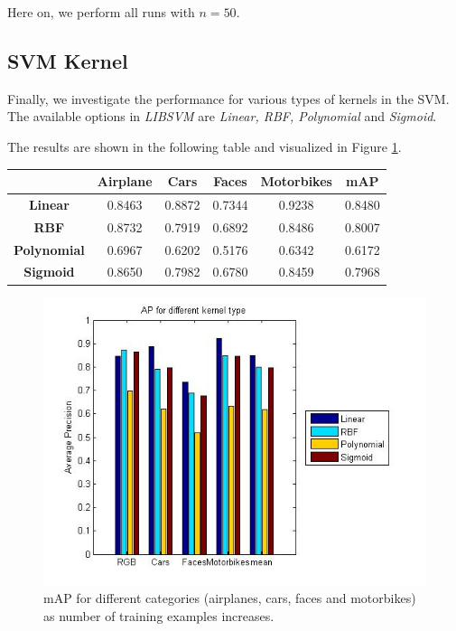 \documentclass[11pt]{article}
\begin{document}
Here on, we perform all runs with $n = 50$. 

\subsection{SVM Kernel}
Finally, we investigate the performance for various types of kernels in the SVM. The available options in \textit{LIBSVM} are \textit{Linear, RBF, Polynomial} and \textit{Sigmoid}. 

The results are shown in the following table and visualized in Figure \ref{fig:svm_kernel}. 

\begin{center}
	\begin{tabular}{| c | c | c | c | c | c |}
		\hline
		\textbf{} & \textbf{Airplane} & \textbf{Cars} & \textbf{Faces} & \textbf{Motorbikes} & \textbf{mAP} \\ \hline
		\textbf{Linear} & 0.8463 & 0.8872 & 0.7344 & 0.9238 & 0.8480 \\ \hline
		\textbf{RBF} & 0.8732 & 0.7919 & 0.6892 & 0.8486 & 0.8007 \\ \hline
		\textbf{Polynomial} & 0.6967 & 0.6202 & 0.5176 & 0.6342 & 0.6172 \\ \hline
		\textbf{Sigmoid} & 0.8650 & 0.7982 & 0.6780 & 0.8459 & 0.7968 \\ 
		\hline
	\end{tabular}
\end{center}

\begin{figure}[h]
	\centering
	\includegraphics[width=.8\textwidth]{img/svm_kernel.jpg}
	\caption{mAP for different categories (airplanes, cars, faces and motorbikes) as number of training examples increases.}
	\label{fig:svm_kernel}
\end{figure}
\end{document}
